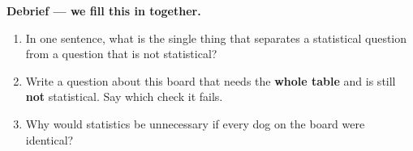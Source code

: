 \documentclass[10pt]{article}
\newcommand{\answerspace}[2]{\par\nopagebreak\noindent\begin{minipage}[t][#1][t]{\linewidth}%
  \color{keyred}\bfseries #2\end{minipage}\par}
\begin{document}
\boxguard[18]
\begin{reflectionbox}
\small
\textbf{Debrief --- we fill this in together.}
\begin{enumerate}[leftmargin=1.9em, itemsep=8pt]
  \item In one sentence, what is the single thing that separates a statistical question from
        a question that is not statistical?
        \answerspace{1.2cm}{}
  \item Write a question about this board that needs the \textbf{whole table} and is still
        \textbf{not} statistical. Say which check it fails.
        \answerspace{1.4cm}{}
  \item Why would statistics be unnecessary if every dog on the board were identical?
        \answerspace{1.2cm}{}
\end{enumerate}
\end{reflectionbox}
\end{document}
